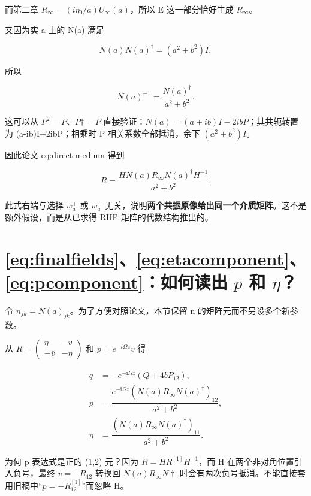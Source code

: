 而第二章 $R_{\infty}=(i\eta{}_{0}/a)U_{\infty}(a)$，所以 E 这一部分恰好生成 $R_{\infty}$。\par

又因为实 a 上的 N(a) 满足\par

\[
N(a)N(a)^\dagger=(a^2+b^2)I,
\]

所以\par

\[
N(a)^{-1}=\dfrac{N(a)^\dagger}{a^2+b^2}.
\]

这可以从 $P^{2}=P$、$P†=P$ 直接验证：$N(a)=(a+ib)I-2ibP$；其共轭转置为 (a-ib)I+2ibP；相乘时 P 相关系数全部抵消，余下 $(a^{2}+b^{2})I$。\par

因此论文 eq:direct-medium 得到\par

\[
\boxed{
R=\dfrac{HN(a)R_\infty N(a)^\dagger H^{-1}}
{a^2+b^2}.
}
\]

此式右端与选择 $w_{a}^{+}$ 或 $w_{a}^{-}$ 无关，说明\textbf{两个共振原像给出同一个介质矩阵}。这不是额外假设，而是从已求得 RHP 矩阵的代数结构推出的。\par

\section{\texorpdfstring{\eqref{eq:finalfields}、\eqref{eq:etacomponent}、\eqref{eq:pcomponent}}{eq:finalfields, eq:etacomponent, eq:pcomponent}：如何读出 \texorpdfstring{$p$}{p} 和 \texorpdfstring{$\eta$}{eta}？}

令 $n_{jk}=N(a)_{jk}$。为了方便对照论文，本节保留 n 的矩阵元而不另设多个新参数。\par

从 $R=\begin{pmatrix}\eta{}&-v\\-\bar v&-\eta{}\end{pmatrix}$ 和 $p=e^{-i\Omega{}z}v$ 得\par

\[
\boxed{
\begin{aligned}
q&=-e^{-\mathrm{i}\Omega z}(Q+4bP_{12}),\\
p&=\dfrac{e^{-\mathrm{i}\Omega z}
(N(a)R_\infty N(a)^\dagger)_{12}}{a^2+b^2},\\
\eta&=\dfrac{(N(a)R_\infty N(a)^\dagger)_{11}}{a^2+b^2}.
\end{aligned}}
\]

为何 p 表达式是正的 (1,2) 元？因为 $R=H R^{[1]}H^{-1}$，而 H 在两个非对角位置引入负号，最终 $v=-R_{12}$ 转换回 $N(a)R_{\infty}N†$ 时会有两次负号抵消。不能直接套用旧稿中“$p=-R^{[1]}_{12}$”而忽略 H。\par

